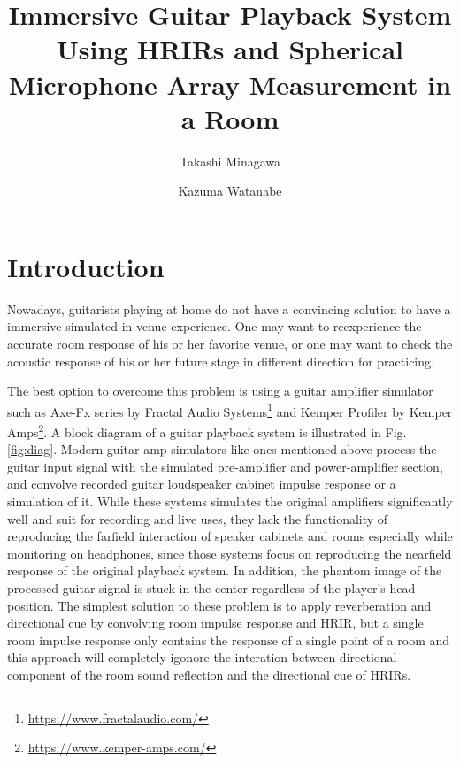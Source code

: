 \documentclass[convention,e-brief]{aesconf-current}
\title{ Immersive Guitar Playback System Using HRIRs and Spherical Microphone Array Measurement in a Room}
\author[1]{Takashi Minagawa}
\author[1]{Kazuma Watanabe}
\affil[1]{Graduate School of Design, Kyushu University}
\begin{document}

\section{Introduction}

Nowadays, guitarists playing at home do not have a convincing solution to have a immersive simulated in-venue experience.
One may want to reexperience the accurate room response of his or her favorite venue, or one may want to check the acoustic response of his or her future stage in different direction for practicing.


The best option to overcome this problem is using a guitar amplifier simulator such as Axe-Fx series by Fractal Audio Systems\footnote{\url{https://www.fractalaudio.com/}} and Kemper Profiler by Kemper Amps\footnote{\url{https://www.kemper-amps.com/}}.
A block diagram of a guitar playback system is illustrated in Fig.\ref{fig:diag}.
Modern guitar amp simulators like ones mentioned above process the guitar input signal with the simulated pre-amplifier and power-amplifier section, and convolve recorded guitar loudspeaker cabinet impulse response or a simulation of it.
While these systems simulates the original amplifiers significantly well and suit for recording and live uses, they lack the functionality of reproducing the farfield interaction of speaker cabinets and rooms especially while monitoring on headphones, since those systems focus on reproducing the nearfield response of the original playback system.
In addition, the phantom image of the processed guitar signal is stuck in the center regardless of the player's head position.
The simplest solution to these problem is to apply reverberation and directional cue by convolving room impulse response and HRIR, but a single room impulse response only contains the response of a single point of a room and this approach will completely igonore the interation between directional component of the room sound reflection and the directional cue of HRIRs.
\end{document}
